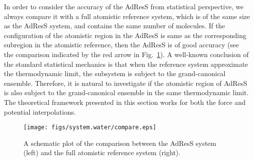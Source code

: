 \documentclass[epjST]{svjour}
\newcommand{\recheck}[1]{{\color{red} #1}}
\begin{document}
In order to consider the accuracy of the AdResS from statistical perspective, we always compare it with a full
atomistic reference system, which is of the same size as the AdResS system,
and contains the same number of molecules.
If the configuration of the atomistic region in the AdResS 
is same as the corresponding subregion in the atomistic reference, then
the AdResS  is of good accuracy (see the comparison indicated by the red arrow in Fig.~\ref{fig:compare}).
A well-known conclusion of the standard statistical mechanics is that
when the reference system approximate the thermodynamic limit, the subsystem is
subject to the grand-canonical ensemble. Therefore, it is natural to investigate
if the atomistic region of AdResS is also subject to the grand-canonical ensemble
in the same thermodynamic limit. The theoretical framework presented in this section works for
both the force and potential interpolations.

\begin{figure}
  \centering
  \texttt{[image: figs/system.water/compare.eps]}
  \caption{A schematic plot of the comparison between the AdResS system (left) and the full atomistic reference system (right).}
  \label{fig:compare}
\end{figure}
\end{document}
